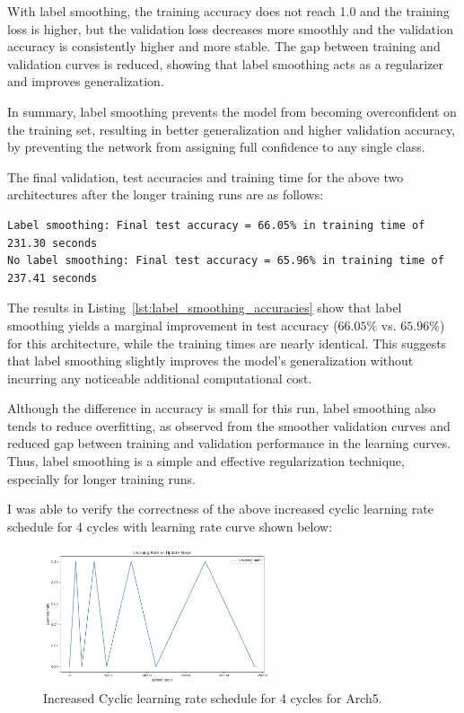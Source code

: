 \documentclass[11pt]{article}
\begin{document}
With label smoothing, the training accuracy does not reach 1.0 and the training loss is higher, but the validation loss decreases more smoothly and the validation accuracy is consistently higher and more stable. The gap between training and validation curves is reduced, showing that label smoothing acts as a regularizer and improves generalization.

In summary, label smoothing prevents the model from becoming overconfident on the training set, resulting in better generalization and higher validation accuracy, by preventing the network from assigning full confidence to any single class.

The final validation, test accuracies and training time for the above two architectures after the longer training runs are as follows:
\begin{lstlisting}[caption={Final test accuracies and training time of Arch5 with and without label smoothing}, label={lst:label_smoothing_accuracies}]
Label smoothing: Final test accuracy = 66.05% in training time of 231.30 seconds
No label smoothing: Final test accuracy = 65.96% in training time of 237.41 seconds
\end{lstlisting}

The results in Listing~\ref{lst:label_smoothing_accuracies} show that label smoothing yields a marginal improvement in test accuracy ($66.05\%$ vs. $65.96\%$) for this architecture, while the training times are nearly identical. 
This suggests that label smoothing slightly improves the model's generalization without incurring any noticeable additional computational cost. 

Although the difference in accuracy is small for this run, label smoothing also tends to reduce overfitting, as observed from the smoother validation curves and reduced gap between training and validation performance in the learning curves. Thus, label smoothing is a simple and effective regularization technique, especially for longer training runs.


I was able to verify the correctness of the above increased cyclic learning rate schedule for 4 cycles with learning rate curve shown below:

\begin{figure}[H]
  \centering
  \includegraphics[width=0.6\textwidth]{results/architecture_ConvNet_no_smoothing_learning_rate_plot.png}
  \caption{Increased Cyclic learning rate schedule for 4 cycles for Arch5.}
  \label{fig:increased_cyclic_learning_rate5}
\end{figure}
\end{document}
